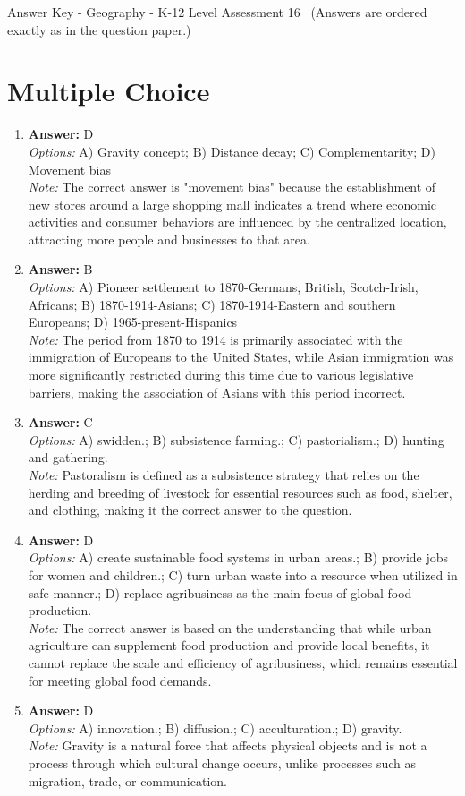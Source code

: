 \documentclass[12pt]{article}
\begin{document}
\begin{center}
Answer Key - Geography - K-12 Level Assessment 16 \
\small (Answers are ordered exactly as in the question paper.)
\end{center}

\section*{Multiple Choice}
\begin{enumerate}[label=\arabic*.]
\item \textbf{Answer:} D
\\ \textit{Options:} A) Gravity concept; B) Distance decay; C) Complementarity; D) Movement bias
\\ \textit{Note:} The correct answer is "movement bias" because the establishment of new stores around a large shopping mall indicates a trend where economic activities and consumer behaviors are influenced by the centralized location, attracting more people and businesses to that area.
\item \textbf{Answer:} B
\\ \textit{Options:} A) Pioneer settlement to 1870-Germans, British, Scotch-Irish, Africans; B) 1870-1914-Asians; C) 1870-1914-Eastern and southern Europeans; D) 1965-present-Hispanics
\\ \textit{Note:} The period from 1870 to 1914 is primarily associated with the immigration of Europeans to the United States, while Asian immigration was more significantly restricted during this time due to various legislative barriers, making the association of Asians with this period incorrect.
\item \textbf{Answer:} C
\\ \textit{Options:} A) swidden.; B) subsistence farming.; C) pastorialism.; D) hunting and gathering.
\\ \textit{Note:} Pastoralism is defined as a subsistence strategy that relies on the herding and breeding of livestock for essential resources such as food, shelter, and clothing, making it the correct answer to the question.
\item \textbf{Answer:} D
\\ \textit{Options:} A) create sustainable food systems in urban areas.; B) provide jobs for women and children.; C) turn urban waste into a resource when utilized in safe manner.; D) replace agribusiness as the main focus of global food production.
\\ \textit{Note:} The correct answer is based on the understanding that while urban agriculture can supplement food production and provide local benefits, it cannot replace the scale and efficiency of agribusiness, which remains essential for meeting global food demands.
\item \textbf{Answer:} D
\\ \textit{Options:} A) innovation.; B) diffusion.; C) acculturation.; D) gravity.
\\ \textit{Note:} Gravity is a natural force that affects physical objects and is not a process through which cultural change occurs, unlike processes such as migration, trade, or communication.
\end{enumerate}
\end{document}

